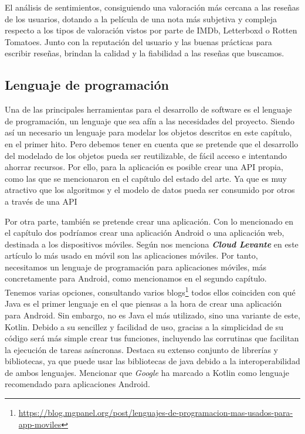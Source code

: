 El análisis de sentimientos, consiguiendo una valoración más cercana a las reseñas de los usuarios, 
dotando a la película de una nota más subjetiva y compleja respecto a los tipos de valoración vistos 
por parte de IMDb, Letterboxd o Rotten Tomatoes. Junto con la reputación del usuario y las buenas 
prácticas para escribir reseñas, brindan la calidad y la fiabilidad a las reseñas que buscamos.

\subsection{Lenguaje de programación}

Una de las principales herramientas para el desarrollo de software es el lenguaje de programación, un 
lenguaje que sea afín a las necesidades del proyecto. Siendo así un necesario un lenguaje para modelar 
los objetos descritos en este capítulo, en el primer hito. Pero debemos tener en cuenta que se pretende 
que el desarrollo del modelado de los objetos pueda ser reutilizable, de fácil acceso e intentando 
ahorrar recursos. Por ello, para la aplicación es posible crear una API propia, como las que se 
mencionaron en el capítulo del estado del arte. Ya que es muy atractivo que los algoritmos y el modelo 
de datos pueda ser consumido por otros a través de una API

Por otra parte, también se pretende crear una aplicación. Con lo mencionado en el capítulo dos 
podríamos crear una aplicación Android o una aplicación web, destinada a los 
dispositivos móviles. Según nos menciona \textbf{\textit{Cloud Levante}} en este artículo 
\cite{WebVSApp} lo más usado en móvil son las aplicaciones móviles. Por 
tanto, necesitamos un lenguaje de programación para aplicaciones móviles, más concretamente para 
Android, como mencionamos en el segundo capítulo. Tenemos varias opciones, consultando varios 
blogs\footnote{\url{https://blog.mgpanel.org/post/lenguajes-de-programacion-mas-usados-para-app-moviles}} todos ellos coinciden con qué Java es el primer lenguaje en el que piensas a la hora de crear 
una aplicación para Android. Sin embargo, no es Java el más utilizado, sino una variante de este, 
Kotlin. Debido a su sencillez y facilidad de uso, gracias a la simplicidad de su código será más simple 
crear tus funciones, incluyendo las corrutinas que facilitan la ejecución de tareas asíncronas. Destaca 
su extenso conjunto de librerías y bibliotecas, ya que puede usar las bibliotecas de java debido a la 
interoperabilidad de ambos lenguajes. Mencionar que \textit{Google} ha marcado a Kotlin como lenguaje 
recomendado para aplicaciones Android.

